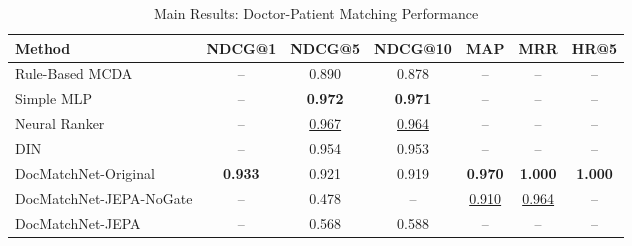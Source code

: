 \begin{table}[t]
\centering
\caption{Main Results: Doctor-Patient Matching Performance}
\label{tab:main_results}
\begin{tabular}{@{}lcccccc@{}}
\toprule
\textbf{Method} & \textbf{NDCG@1} & \textbf{NDCG@5} & \textbf{NDCG@10} & \textbf{MAP} & \textbf{MRR} & \textbf{HR@5} \\
\midrule
Rule-Based MCDA & -- & 0.890 & 0.878 & -- & -- & -- \\
Simple MLP & -- & \textbf{0.972} & \textbf{0.971} & -- & -- & -- \\
Neural Ranker & -- & \underline{0.967} & \underline{0.964} & -- & -- & -- \\
DIN & -- & 0.954 & 0.953 & -- & -- & -- \\
DocMatchNet-Original & \textbf{0.933} & 0.921 & 0.919 & \textbf{0.970} & \textbf{1.000} & \textbf{1.000} \\
DocMatchNet-JEPA-NoGate & -- & 0.478 & -- & \underline{0.910} & \underline{0.964} & -- \\
DocMatchNet-JEPA & -- & 0.568 & 0.588 & -- & -- & -- \\
\bottomrule
\end{tabular}
\end{table}